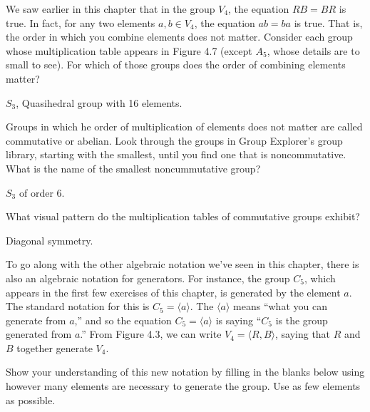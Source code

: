 \begin{questions}
	\question We saw earlier in this chapter that in the group $V_4$, the equation $RB=BR$ is true. In fact, for any two elements $a,b\in V_4$, the equation $ab=ba$ is true. That is, the order in which you combine elements does not matter. Consider each group whose multiplication table appears in Figure 4.7 (except $A_5$, whose details are to small to see). For which of those groups does the order of combining elements matter?
	\begin{solution}
		\par $S_3$, Quasihedral group with 16 elements.
	\end{solution}

	\question Groups in which he order of multiplication of elements does not matter are called commutative or abelian. Look through the groups in Group Explorer's group library, starting with the smallest, until you find one that is noncommutative. What is the name of the smallest noncummutative group?
	\begin{solution}
		$S_3$ of order 6.
	\end{solution}

	\question What visual pattern do the multiplication tables of commutative groups exhibit?
 	\begin{solution}
		\par Diagonal symmetry.
	\end{solution}

	\question To go along with the other algebraic notation we've seen in this chapter, there is also an algebraic notation for generators. For instance, the group $C_5$, which appears in the first few exercises of this chapter, is generated by the element $a$. The standard notation for this is $C_5 = \langle a\rangle$. The $\langle a\rangle$ means ``what you can generate from $a$,'' and so the equation $C_5=\langle a\rangle$ is saying ``$C_5$ is the group generated from $a$.'' From Figure 4.3, we can write $V_4 = \langle R,B\rangle$, saying that $R$ and $B$ together generate $V_4$.
	\par Show your understanding of this new notation by filling in the blanks below using however many elements are necessary to generate the group. Use as few elements as possible.
\end{questions}
